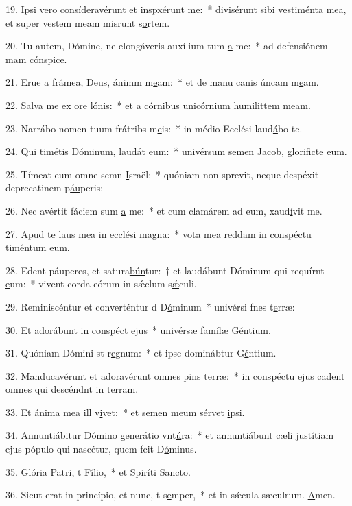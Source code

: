 19. Ipsi vero consíderavérunt et inspx\uline{é}runt me:~* divisérunt sibi vestiménta mea, et super vestem meam misrunt s\uline{o}rtem.\par 
20. Tu autem, Dómine, ne elongáveris auxílium tum \uline{a} me:~* ad defensiónem mam c\uline{ó}nspice.\par 
21. Erue a frámea, Deus, ánimm m\uline{e}am:~* et de manu canis úncam m\uline{e}am.\par 
22. Salva me ex ore l\uline{ó}nis:~* et a córnibus unicórnium humilittem m\uline{e}am.\par 
23. Narrábo nomen tuum frátribs m\uline{e}is:~* in médio Ecclési laud\uline{á}bo te.\par 
24. Qui timétis Dóminum, laudát \uline{e}um:~* univérsum semen Jacob, glorificte \uline{e}um.\par 
25. Tímeat eum omne semn \uline{I}sraël:~* quóniam non sprevit, neque despéxit deprecatinem p\uline{áu}peris:\par 
26. Nec avértit fáciem sum \uline{a} me:~* et cum clamárem ad eum, xaud\uline{í}vit me.\par 
27. Apud te laus mea in ecclési m\uline{a}gna:~* vota mea reddam in conspéctu timéntum \uline{e}um.\par 
28. Edent páuperes, et satura\uline{bún}tur:~† et laudábunt Dóminum qui requírnt \uline{e}um:~* vivent corda eórum in sǽclum s\uline{ǽ}culi.\par 
29. Reminiscéntur et converténtur d D\uline{ó}minum~* univérsi fnes t\uline{e}rræ:\par 
30. Et adorábunt in conspéct \uline{e}jus~* univérsæ famílæ G\uline{é}ntium.\par 
31. Quóniam Dómini st r\uline{e}gnum:~* et ipse dominábtur G\uline{é}ntium.\par 
32. Manducavérunt et adoravérunt omnes pins t\uline{e}rræ:~* in conspéctu ejus cadent omnes qui descéndnt in t\uline{e}rram.\par 
33. Et ánima mea ill v\uline{i}vet:~* et semen meum sérvet \uline{i}psi.\par 
34. Annuntiábitur Dómino generátio vnt\uline{ú}ra:~* et annuntiábunt cæli justítiam ejus pópulo qui nascétur, quem fcit D\uline{ó}minus.\par 
35. Glória Patri, t F\uline{í}lio,~* et Spiríti S\uline{a}ncto.\par 
36. Sicut erat in princípio, et nunc, t s\uline{e}mper,~* et in sǽcula sæculrum. \uline{A}men.\par 
